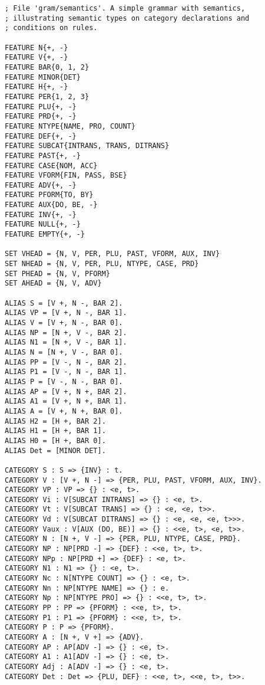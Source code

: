 \newpage
{\small
\begin{verbatim}
; File 'gram/semantics'. A simple grammar with semantics,
; illustrating semantic types on category declarations and
; conditions on rules.

FEATURE N{+, -}
FEATURE V{+, -}
FEATURE BAR{0, 1, 2}
FEATURE MINOR{DET}
FEATURE H{+, -}
FEATURE PER{1, 2, 3}
FEATURE PLU{+, -}
FEATURE PRD{+, -}
FEATURE NTYPE{NAME, PRO, COUNT}
FEATURE DEF{+, -}
FEATURE SUBCAT{INTRANS, TRANS, DITRANS}
FEATURE PAST{+, -}
FEATURE CASE{NOM, ACC}
FEATURE VFORM{FIN, PASS, BSE}
FEATURE ADV{+, -}
FEATURE PFORM{TO, BY}
FEATURE AUX{DO, BE, -}
FEATURE INV{+, -}
FEATURE NULL{+, -}
FEATURE EMPTY{+, -}

SET VHEAD = {N, V, PER, PLU, PAST, VFORM, AUX, INV}
SET NHEAD = {N, V, PER, PLU, NTYPE, CASE, PRD}
SET PHEAD = {N, V, PFORM}
SET AHEAD = {N, V, ADV}

ALIAS S = [V +, N -, BAR 2].
ALIAS VP = [V +, N -, BAR 1].
ALIAS V = [V +, N -, BAR 0].
ALIAS NP = [N +, V -, BAR 2].
ALIAS N1 = [N +, V -, BAR 1].
ALIAS N = [N +, V -, BAR 0].
ALIAS PP = [V -, N -, BAR 2].
ALIAS P1 = [V -, N -, BAR 1].
ALIAS P = [V -, N -, BAR 0].
ALIAS AP = [V +, N +, BAR 2].
ALIAS A1 = [V +, N +, BAR 1].
ALIAS A = [V +, N +, BAR 0].
ALIAS H2 = [H +, BAR 2].
ALIAS H1 = [H +, BAR 1].
ALIAS H0 = [H +, BAR 0].
ALIAS Det = [MINOR DET].

CATEGORY S : S => {INV} : t.
CATEGORY V : [V +, N -] => {PER, PLU, PAST, VFORM, AUX, INV}.
CATEGORY VP : VP => {} : <e, t>.
CATEGORY Vi : V[SUBCAT INTRANS] => {} : <e, t>.
CATEGORY Vt : V[SUBCAT TRANS] => {} : <e, <e, t>>.
CATEGORY Vd : V[SUBCAT DITRANS] => {} : <e, <e, <e, t>>>.
CATEGORY Vaux : V[AUX (DO, BE)] => {} : <<e, t>, <e, t>>.
CATEGORY N : [N +, V -] => {PER, PLU, NTYPE, CASE, PRD}.
CATEGORY NP : NP[PRD -] => {DEF} : <<e, t>, t>.
CATEGORY NPp : NP[PRD +] => {DEF} : <e, t>.
CATEGORY N1 : N1 => {} : <e, t>.
CATEGORY Nc : N[NTYPE COUNT] => {} : <e, t>.
CATEGORY Nn : NP[NTYPE NAME] => {} : e.
CATEGORY Np : NP[NTYPE PRO] => {} : <<e, t>, t>.
CATEGORY PP : PP => {PFORM} : <<e, t>, t>.
CATEGORY P1 : P1 => {PFORM} : <<e, t>, t>.
CATEGORY P : P => {PFORM}.
CATEGORY A : [N +, V +] => {ADV}.
CATEGORY AP : AP[ADV -] => {} : <e, t>.
CATEGORY A1 : A1[ADV -] => {} : <e, t>.
CATEGORY Adj : A[ADV -] => {} : <e, t>.
CATEGORY Det : Det => {PLU, DEF} : <<e, t>, <<e, t>, t>>.


\end{verbatim}}
